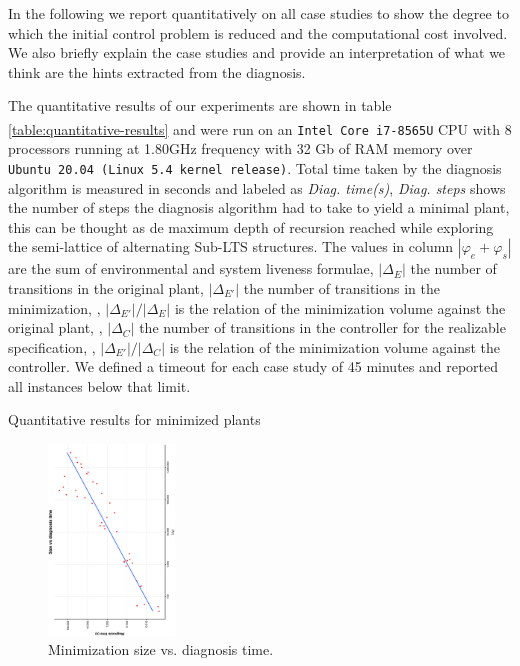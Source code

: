 In the following we report quantitatively on all case studies to show the degree to which the initial control problem is reduced and the computational cost involved. We also briefly explain the case studies and provide an interpretation of what we think are the hints extracted from the diagnosis. 

The quantitative results of our experiments are shown in table 
\ref{table:quantitative-results} and were run on an 
\texttt{Intel\textsuperscript{\textregistered} Core\textsuperscript{\texttrademark}
 i7-8565U} CPU with 8 processors running at 1.80GHz frequency
with 32 Gb of RAM memory over \texttt{Ubuntu 20.04 (Linux 5.4 kernel release)}.
Total time taken by the diagnosis algorithm is measured in seconds and
labeled as \emph{Diag. time(s)}, \emph{Diag. steps} shows the number of steps the diagnosis algorithm had to take to yield a minimal plant, this can be thought as de maximum depth of recursion reached while exploring the semi-lattice of alternating Sub-LTS structures.  The values in column $|\varphi_e + \varphi_s|$ are the sum of environmental and system liveness formulae, $|\Delta_{E}|$ the number of transitions in the original plant, $|\Delta_{E'}|$ the number of transitions in the minimization,
, $|\Delta_{E'}|/|\Delta_{E}|$ is the relation of the minimization volume against the original plant, , $|\Delta_{C}|$ the number of transitions in the controller for the realizable specification,
, $|\Delta_{E'}|/|\Delta_{C}|$ is the relation of the minimization volume against the controller.
We defined a timeout for each case study of 45 minutes and reported all instances below that limit.
\begin{table}
	\resizebox{\textwidth}{!} {

}
  \caption{Quantitative results for minimized plants}
  \label{table:quantitative-results}
 \end{table}
\begin{figure}[bt]
	\centering
	\SmallPicture
	\includegraphics[width=0.3\textwidth, angle=-90]{../experimental_setting/tmp_results/size_vs_diag_time.ps}
	\vspace*{-2mm}
	\caption{Minimization size vs. diagnosis time.}
	\label{fig:size_vs_diag_time}
	\vspace*{-4mm}
	\MediumPicture
\end{figure}
